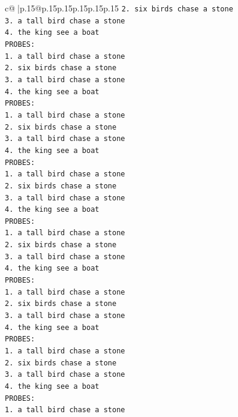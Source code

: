 \documentclass{article}
\begin{document}
{\begin{supertabular}{c@{$\;$}|p{.15\linewidth}@{}p{.15\linewidth}p{.15\linewidth}p{.15\linewidth}p{.15\linewidth}p{.15\linewidth}}
{{{\texttt{2. six birds chase a stone} \\
\texttt{3. a tall bird chase a stone} \\
\texttt{4. the king see a boat} \\
\texttt{PROBES:} \\
\texttt{1. a tall bird chase a stone} \\
\texttt{2. six birds chase a stone} \\
\texttt{3. a tall bird chase a stone} \\
\texttt{4. the king see a boat} \\
\texttt{PROBES:} \\
\texttt{1. a tall bird chase a stone} \\
\texttt{2. six birds chase a stone} \\
\texttt{3. a tall bird chase a stone} \\
\texttt{4. the king see a boat} \\
\texttt{PROBES:} \\
\texttt{1. a tall bird chase a stone} \\
\texttt{2. six birds chase a stone} \\
\texttt{3. a tall bird chase a stone} \\
\texttt{4. the king see a boat} \\
\texttt{PROBES:} \\
\texttt{1. a tall bird chase a stone} \\
\texttt{2. six birds chase a stone} \\
\texttt{3. a tall bird chase a stone} \\
\texttt{4. the king see a boat} \\
\texttt{PROBES:} \\
\texttt{1. a tall bird chase a stone} \\
\texttt{2. six birds chase a stone} \\
\texttt{3. a tall bird chase a stone} \\
\texttt{4. the king see a boat} \\
\texttt{PROBES:} \\
\texttt{1. a tall bird chase a stone} \\
\texttt{2. six birds chase a stone} \\
\texttt{3. a tall bird chase a stone} \\
\texttt{4. the king see a boat} \\
\texttt{PROBES:} \\
\texttt{1. a tall bird chase a stone} \\
}}}
\end{supertabular}}
\end{document}
